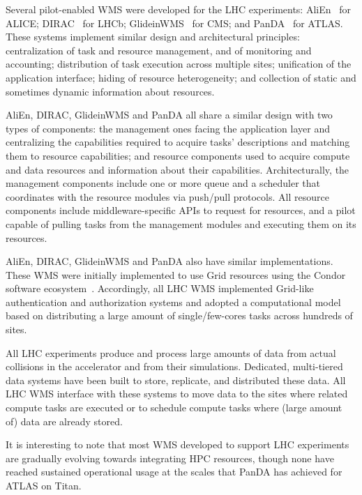 Several pilot-enabled WMS were developed for the LHC experiments:
AliEn~\cite{Bagnasco2010} for ALICE\@; DIRAC~\cite{Paterson2010} for LHCb;
GlideinWMS~\cite{sfiligoi2008glideinwms} for CMS\@; and
PanDA~\cite{maeno2014evolution} for ATLAS\@. These systems implement similar
design and architectural principles: centralization of task and resource
management, and of monitoring and accounting; distribution of task execution
across multiple sites; unification of the application interface; hiding of
resource heterogeneity; and collection of static and sometimes dynamic
information about resources.

AliEn, DIRAC, GlideinWMS and PanDA all share a similar design with two types
of components: the management ones facing the application layer and
centralizing the capabilities required to acquire tasks' descriptions and
matching them to resource capabilities; and resource components used to
acquire compute and data resources and information about their capabilities.
Architecturally, the management components include one or more queue and a
scheduler that coordinates with the resource modules via push/pull protocols.
All resource components include middleware-specific APIs to request for
resources, and a pilot capable of pulling tasks from the management modules
and executing them on its resources.

AliEn, DIRAC, GlideinWMS and PanDA also have similar implementations. These
WMS were initially implemented to use Grid resources using the Condor
software ecosystem~\cite{thain2005distributed}. Accordingly, all LHC WMS
implemented Grid-like authentication and authorization systems and adopted a
computational model based on distributing a large amount of single/few-cores
tasks across hundreds of sites.

All LHC experiments produce and process large amounts  of data from actual
collisions in the accelerator and from their simulations. Dedicated,
multi-tiered data systems have been built to store, replicate, and
distributed these data. All LHC WMS interface with these systems to move data
to the sites where related compute tasks are executed or to schedule compute
tasks where (large amount of) data are already stored.

It is interesting to note that most WMS developed to support LHC experiments
are gradually evolving towards integrating HPC resources, though none have
reached sustained operational usage at the scales that PanDA has achieved for
ATLAS on Titan.